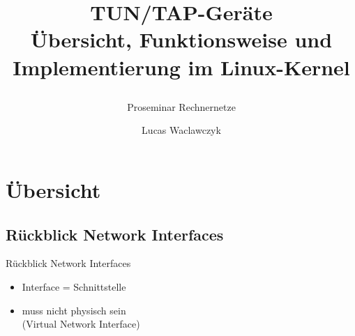 \documentclass[ngerman,aspectratio=169]{beamer}
\title{TUN/TAP-Geräte\protect\\\mdseries Übersicht, Funktionsweise und Implementierung im Linux-Kernel\strut}
\subtitle{Proseminar Rechnernetze}
\author{Lucas Waclawczyk}
\begin{document}
	\maketitle
	
	
	\section{Übersicht}
	\subsection{Rückblick Network Interfaces}
	\begin{frame}{Rückblick Network Interfaces}
		\begin{multicols}{2}
			\begin{itemize}
				\setlength{\itemsep}{1em}
				\item Interface = Schnittstelle
				\item muss nicht physisch sein\\(Virtual Network Interface)
			\end{itemize}
		\end{multicols}
	\end{frame}
\end{document}
